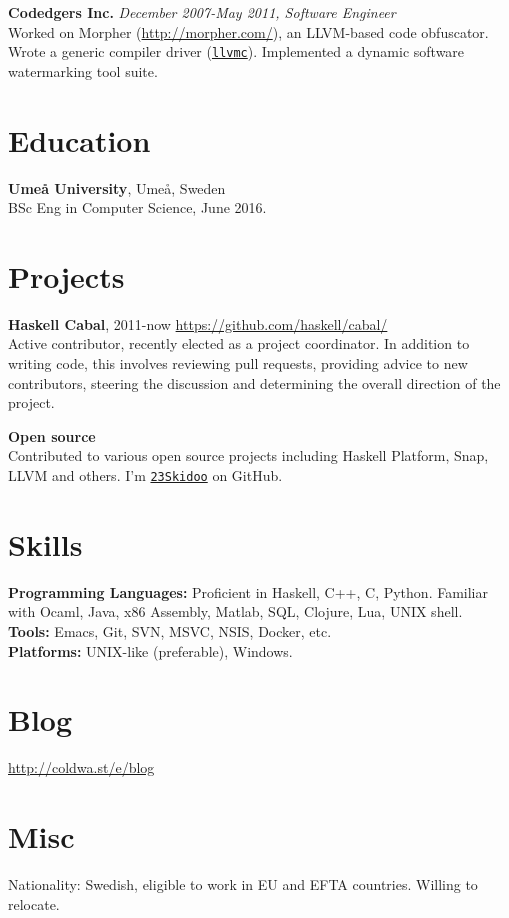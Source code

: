 \documentclass[margin,line]{res}
\begin{document}
\begin{resume}
{\bf Codedgers Inc.} \hfill {\it December 2007-May 2011, Software Engineer}\\
Worked on Morpher (\url{http://morpher.com/}), an LLVM-based code
obfuscator. Wrote a generic compiler driver
(\href{http://llvm.org/releases/2.9/docs/CompilerDriver.html}{\texttt{llvmc}}). Implemented
a dynamic software watermarking tool suite.

\section{\sc Education}
{\bf Umeå University}, Umeå, Sweden\\
BSc Eng in Computer Science, June 2016.

\section{\sc Projects}

{\bf Haskell Cabal}, 2011-now \hfill \url{https://github.com/haskell/cabal/}\\
Active contributor, recently elected as a project coordinator. In addition to
writing code, this involves reviewing pull requests, providing advice to new
contributors, steering the discussion and determining the overall direction of
the project.

{\bf Open source}\\ Contributed to various open source projects including
Haskell Platform, Snap, LLVM and others. I'm
\href{https://github.com/23Skidoo/}{\texttt{23Skidoo}} on GitHub.

\section{\sc Skills}

{\bf Programming Languages:} Proficient in Haskell, C++, C, Python. Familiar
with Ocaml, Java, x86 Assembly, Matlab, SQL, Clojure, Lua, UNIX shell. \\
{\bf Tools:} Emacs, Git, SVN, MSVC, NSIS, Docker, etc.\\
{\bf Platforms:} UNIX-like (preferable), Windows.

\section{\sc Blog}
\url{http://coldwa.st/e/blog}

\section{\sc Misc}

Nationality: Swedish, eligible to work in EU and EFTA countries. Willing to relocate.

\end{resume}
\end{document}
